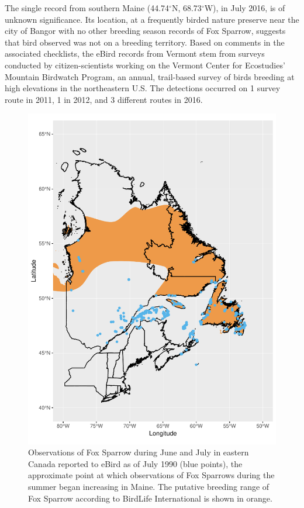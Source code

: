 \documentclass[fleqn,10pt,lineno]{wlpeerj} %
\begin{document}
The single record from southern Maine (44.74$^{\circ}$N, 68.73$^{\circ}$W), in July 2016, is of unknown significance. Its location, at a frequently birded nature preserve near the city of Bangor with no other breeding season records of Fox Sparrow, suggests that bird observed was not on a breeding territory. Based on comments in the associated checklists, the eBird records from Vermont stem from surveys conducted by citizen-scientists working on the Vermont Center for Ecostudies’ Mountain Birdwatch Program, an annual, trail-based survey of birds breeding at high elevations in the northeastern U.S. The detections occurred on 1 survey route in 2011, 1 in 2012, and 3 different routes in 2016.

\begin{figure}[ht]\centering
\includegraphics[width=\linewidth]{Figure1}
\caption{Observations of Fox Sparrow during June and July in eastern Canada reported to eBird as of July 1990 (blue points), the approximate point at which observations of Fox Sparrows during the summer began increasing in Maine. The putative breeding range of Fox Sparrow according to BirdLife International \citep{birdlife2014bird} is shown in orange.}
\label{fig:Figure1}
\end{figure}
\end{document}
